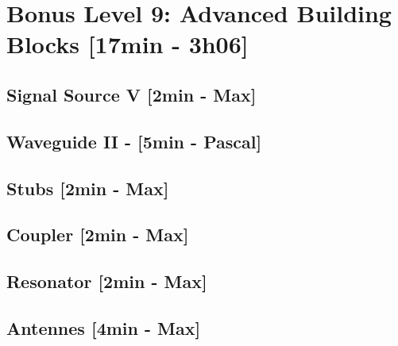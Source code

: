 
\section{Bonus Level 9: Advanced Building Blocks [17min - 3h06]}
\subsection{Signal Source V [2min - Max]}

\subsection{Waveguide II - [5min - Pascal]}

\subsection{Stubs [2min - Max]}

\subsection{Coupler [2min - Max]}

\subsection{Resonator [2min - Max]}

\subsection{Antennes [4min - Max]}
